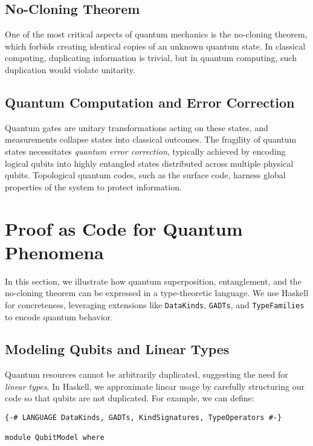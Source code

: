 \documentclass[12pt]{article}
\begin{document}
\begin{itemize}[label=$\bullet$]
\subsection{No-Cloning Theorem}
One of the most critical aspects of quantum mechanics is the no-cloning theorem, which forbids creating identical copies of an unknown quantum state. In classical computing, duplicating information is trivial, but in quantum computing, such duplication would violate unitarity.

\subsection{Quantum Computation and Error Correction}
Quantum gates are unitary transformations acting on these states, and measurements collapse states into classical outcomes. The fragility of quantum states necessitates \emph{quantum error correction}, typically achieved by encoding logical qubits into highly entangled states distributed across multiple physical qubits. Topological quantum codes, such as the surface code, harness global properties of the system to protect information.

\section{Proof as Code for Quantum Phenomena}
\label{sec:proof_as_code}

In this section, we illustrate how quantum superposition, entanglement, and the no-cloning theorem can be expressed in a type-theoretic language. We use Haskell for concreteness, leveraging extensions like \texttt{DataKinds}, \texttt{GADTs}, and \texttt{TypeFamilies} to encode quantum behavior.

\subsection{Modeling Qubits and Linear Types}
Quantum resources cannot be arbitrarily duplicated, suggesting the need for \emph{linear types}. In Haskell, we approximate linear usage by carefully structuring our code so that qubits are not duplicated. For example, we can define:

\begin{lstlisting}[caption={A simplified model for a Qubit and its superposition states}, label={lst:qubit_model}]
{-# LANGUAGE DataKinds, GADTs, KindSignatures, TypeOperators #-}

module QubitModel where


\end{lstlisting}
\end{itemize}
\end{document}
